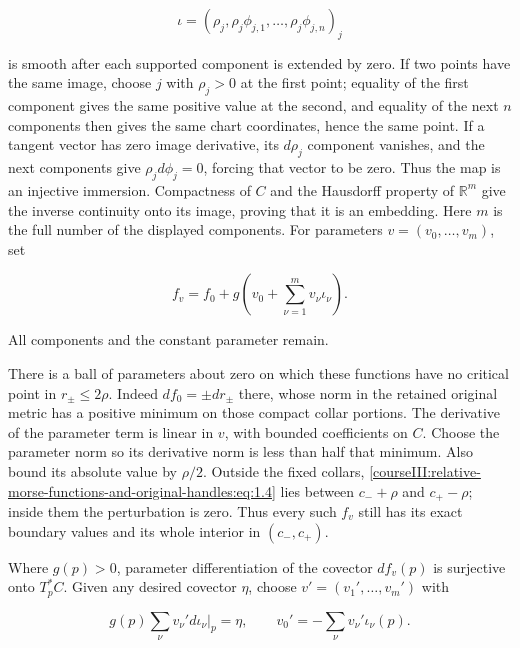 \[
\iota=(\rho_j,\rho_j\phi_{j,1},\ldots,\rho_j\phi_{j,n})_j
\]

is smooth after each supported component is extended by zero. If two points have the same image, choose \(j\) with \(\rho_j>0\) at the first point; equality of the first component gives the same positive value at the second, and equality of the next \(n\) components then gives the same chart coordinates, hence the same point. If a tangent vector has zero image derivative, its \(d\rho_j\) component vanishes, and the next components give \(\rho_j d\phi_j=0\), forcing that vector to be zero. Thus the map is an injective immersion. Compactness of \(C\) and the Hausdorff property of \(\mathbb R^m\) give the inverse continuity onto its image, proving that it is an embedding. Here \(m\) is the full number of the displayed components. For parameters \(v=(v_0,\ldots,v_m)\), set

\begin{equation}
f_v=f_0+g\left(v_0+\sum_{\nu=1}^m v_\nu\iota_\nu\right).
\label{courseIII:relative-morse-functions-and-original-handles:eq:1.5}
\end{equation}

All components and the constant parameter remain.

There is a ball of parameters about zero on which these functions have no critical point in \(r_\pm\leq2\rho\). Indeed \(df_0=\pm dr_\pm\) there, whose norm in the retained original metric has a positive minimum on those compact collar portions. The derivative of the parameter term is linear in \(v\), with bounded coefficients on \(C\). Choose the parameter norm so its derivative norm is less than half that minimum. Also bound its absolute value by \(\rho/2\). Outside the fixed collars, \eqref{courseIII:relative-morse-functions-and-original-handles:eq:1.4} lies between \(c_-+\rho\) and \(c_+-\rho\); inside them the perturbation is zero. Thus every such \(f_v\) still has its exact boundary values and its whole interior in \((c_-,c_+)\).

Where \(g(p)>0\), parameter differentiation of the covector \(df_v(p)\) is surjective onto \(T_p^*C\). Given any desired covector \(\eta\), choose \(v'=(v_1',\ldots,v_m')\) with

\begin{equation}
g(p)\sum_\nu v_\nu' d\iota_\nu|_p=\eta,
\qquad
v_0'=-\sum_\nu v_\nu'\iota_\nu(p).
\label{courseIII:relative-morse-functions-and-original-handles:eq:1.6}
\end{equation}


